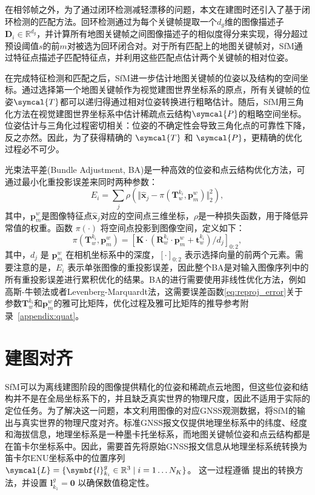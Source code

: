 在相邻帧之外，为了通过闭环检测减轻漂移的问题，本文在建图时还引入了基于闭环检测的匹配方法。回环检测通过为每个关键帧提取一个$d_g$维的图像描述子$\symbf{D}_i \in \mathbb{R}^{d_g}$，并计算所有地图关键帧之间图像描述子的相似度得分来实现，得分超过预设阈值$s$的前$m$对被选为回环闭合对。对于所有匹配上的地图关键帧对，SfM通过特征点描述子匹配特征点，并利用这些匹配点估计两个关键帧的相对位姿。

在完成特征检测和匹配之后，SfM进一步估计地图关键帧的位姿以及结构的空间坐标。通过选择第一个地图关键帧作为视觉建图世界坐标系的原点，所有关键帧的位姿$\symcal{T}$都可以递归得通过相对位姿转换进行粗略估计。随后，SfM用三角化方法在视觉建图世界坐标系中估计稀疏点云结构$\symcal{P}$的粗略空间坐标。位姿估计与三角化过程密切相关：位姿的不确定性会导致三角化点的可靠性下降，反之亦然。因此，为了获得精确的 $\symcal{T}$ 和 $\symcal{P}$，更精确的优化过程必不可少。

光束法平差(Bundle Adjustment, BA)是一种高效的位姿和点云结构优化方法，可通过最小化重投影误差来同时两种参数：
\begin{equation}
\label{eq:reproj_error}
E_i = \sum_{j}\rho(\Vert \hat{\symbf{x}}_j - \pi(\symbf{T}^{k_i}_w, \symbf{p}_{m}^{w}) \Vert ^2_2),
\end{equation}
其中，$\symbf{p}_{m}^{w}$是图像特征点$\hat{\symbf{x}}_j$对应的空间点三维坐标，$\rho$是一种损失函数，用于降低异常值的权重。函数 $\pi(\cdot)$ 将空间点投影到图像空间，定义如下：
\begin{equation}
\label{eq:proj_func}
\pi(\symbf{T}^{k_i}_w, \symbf{p}_{m}^{w}) = [\symbf{K}\cdot(\symbf{R}_w^{k_i}\cdot\symbf{p}_{m}^{w}+\symbf{t}_w^{k_i})/d_j]_{0:2},
\end{equation}
其中，$d_j$ 是 $\symbf{p}_{m}^{w}$ 在相机坐标系中的深度，$[\cdot]_{0:2}$ 表示选择向量的前两个元素。需要注意的是，$E_i$ 表示单张图像的重投影误差，因此整个BA是对输入图像序列中的所有重投影误差进行累积优化的结果。BA的进行需要使用非线性优化方法，例如高斯-牛顿法或者Levenberg-Marquardt法，这需要误差函数\eqref{eq:reproj_error}关于参数$\symbf{T}^{k_i}_w$和$\symbf{p}_{m}^{w}$的雅可比矩阵，优化过程及雅可比矩阵的推导参考附录~\ref{appendix:quat}。


\section{建图对齐}

SfM可以为离线建图阶段的图像提供精化的位姿和稀疏点云地图，但这些位姿和结构并不是在全局坐标系下的，并且缺乏真实世界的物理尺度，因此不适用于实际的定位任务。为了解决这一问题，本文利用图像的对应GNSS观测数据，将SfM的输出与真实世界的物理尺度对齐。标准GNSS报文仅提供地理坐标系中的纬度、经度和海拔信息，地理坐标系是一种墨卡托坐标系，而地图关键帧位姿和点云结构都是在笛卡尔坐标系中。因此，需要首先将原始GNSS报文信息从地理坐标系统转换为笛卡尔ENU坐标系中的位置序列
$\symcal{L} = \{\symbf{l}_{k_i}^g \in \mathbb{R}^3 \mid i=1 \ldots N_K \}$。
这一过程遵循\citet{subirana2011transformations} 提出的转换方法，并设置
$\symbf{l}_{k_1}^g = \symbf{0}$ 以确保数值稳定性。

